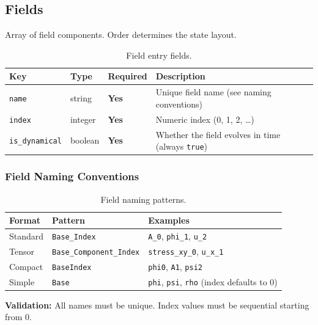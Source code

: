 \subsection{Fields}
\label{sec:json-fields}

Array of field components. Order determines the state layout.

\begin{table}[htbp]
\centering
\caption{Field entry fields.}
\label{tab:json-fields}
\begin{tabular}{@{}llll@{}}
\toprule
Key & Type & Required & Description \\
\midrule
\texttt{name}         & string  & \textbf{Yes} & Unique field name (see naming conventions) \\
\texttt{index}        & integer & \textbf{Yes} & Numeric index (0, 1, 2, \ldots) \\
\texttt{is\_dynamical} & boolean & \textbf{Yes} & Whether the field evolves in time (always \texttt{true}) \\
\bottomrule
\end{tabular}
\end{table}

\subsubsection{Field Naming Conventions}
\label{sec:json-field-naming}

\begin{table}[htbp]
\centering
\caption{Field naming patterns.}
\label{tab:json-field-naming}
\begin{tabular}{@{}lll@{}}
\toprule
Format & Pattern & Examples \\
\midrule
Standard & \texttt{Base\_Index}           & \texttt{A\_0}, \texttt{phi\_1}, \texttt{u\_2} \\
Tensor   & \texttt{Base\_Component\_Index} & \texttt{stress\_xy\_0}, \texttt{u\_x\_1} \\
Compact  & \texttt{BaseIndex}            & \texttt{phi0}, \texttt{A1}, \texttt{psi2} \\
Simple   & \texttt{Base}                 & \texttt{phi}, \texttt{psi}, \texttt{rho} (index defaults to 0) \\
\bottomrule
\end{tabular}
\end{table}

\textbf{Validation:} All names must be unique. Index values must be sequential starting from 0.


